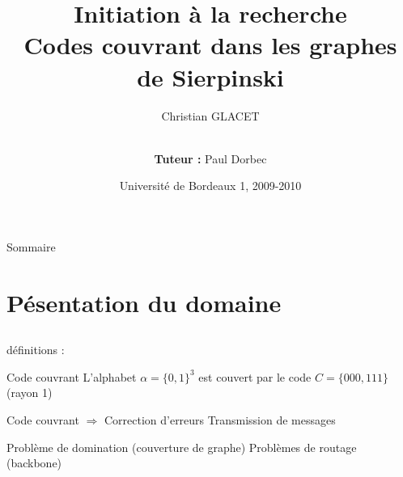 \documentclass{beamer}
\title[] 
{%
  Initiation \`a la recherche \\
  Codes couvrant dans les graphes de Sierpinski
}
\author[]
{%
  Christian GLACET \and \\%
  \textbf{Tuteur :} Paul Dorbec
}
\date[WABI 2009]
{Universit\'e de Bordeaux 1, 2009-2010}
\begin{document}
\begin{frame}
  \titlepage
\end{frame}


\begin{frame}{Sommaire}
  \tableofcontents
\end{frame}

\renewcommand{\secName}{P\'esentation du domaine \xspace}
\section{\secName}

\renewcommand{\subSecName}{\ABc}
\subsection{\subSecName}


\begin{myframe}{d\'efinitions}
\ABc : 
    \begin{block}{Code couvrant}
    	L'alphabet $\alpha = \lbrace 0,1 \rbrace^{3}$ est couvert par le code $C = \lbrace 000, 111 \rbrace$ (rayon 1)
    \end{block}
    \begin{block}{Code couvrant $\Rightarrow$ Correction d'erreurs}
    	Transmission de messages
    \end{block}
    \begin{block}{Problème de domination (couverture de graphe)}
        Problèmes de routage (backbone)
    \end{block}
\end{myframe}

\end{document}
